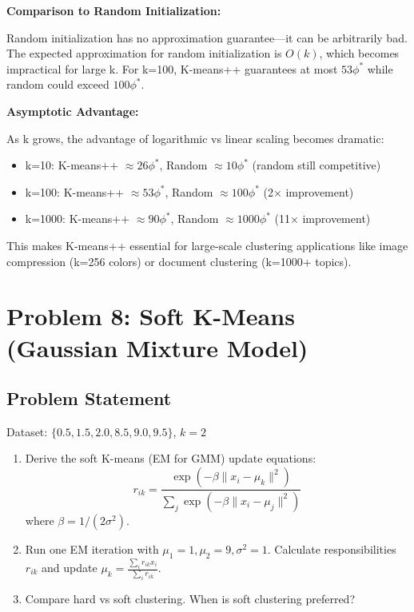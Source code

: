 \documentclass[12pt]{article}
\begin{document}
\begin{explanation}
\textbf{Comparison to Random Initialization:}

Random initialization has no approximation guarantee—it can be arbitrarily bad. The expected approximation for random initialization is $O(k)$, which becomes impractical for large k. For k=100, K-means++ guarantees at most $53\phi^*$ while random could exceed $100\phi^*$.

\textbf{Asymptotic Advantage:}

As k grows, the advantage of logarithmic vs linear scaling becomes dramatic:
\begin{itemize}
    \item k=10: K-means++ $\approx 26\phi^*$, Random $\approx 10\phi^*$ (random still competitive)
    \item k=100: K-means++ $\approx 53\phi^*$, Random $\approx 100\phi^*$ (2× improvement)
    \item k=1000: K-means++ $\approx 90\phi^*$, Random $\approx 1000\phi^*$ (11× improvement)
\end{itemize}

This makes K-means++ essential for large-scale clustering applications like image compression (k=256 colors) or document clustering (k=1000+ topics).

\end{explanation}

\section{Problem 8: Soft K-Means (Gaussian Mixture Model)}

\subsection{Problem Statement}

Dataset: $\{0.5, 1.5, 2.0, 8.5, 9.0, 9.5\}$, $k=2$

\begin{enumerate}
\item[(a)] Derive the soft K-means (EM for GMM) update equations:
\[
r_{ik} = \frac{\exp(-\beta \|x_i - \mu_k\|^2)}{\sum_j \exp(-\beta \|x_i - \mu_j\|^2)}
\]
where $\beta = 1/(2\sigma^2)$.
\item[(b)] Run one EM iteration with $\mu_1=1, \mu_2=9, \sigma^2=1$. Calculate responsibilities $r_{ik}$ and update $\mu_k = \frac{\sum_i r_{ik}x_i}{\sum_i r_{ik}}$.
\item[(c)] Compare hard vs soft clustering. When is soft clustering preferred?
\end{enumerate}
\end{document}
